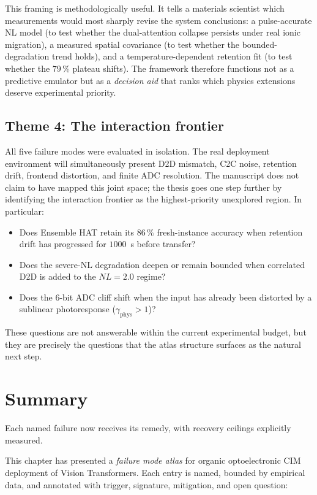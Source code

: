 This framing is methodologically useful.  It tells a materials scientist which measurements would most sharply revise the system conclusions: a pulse-accurate NL model (to test whether the dual-attention collapse persists under real ionic migration), a measured spatial covariance (to test whether the bounded-degradation trend holds), and a temperature-dependent retention fit (to test whether the $79\,\%$ plateau shifts).  The framework therefore functions not as a predictive emulator but as a \emph{decision aid} that ranks which physics extensions deserve experimental priority.

\subsection{Theme 4: The interaction frontier}

All five failure modes were evaluated in isolation.  The real deployment environment will simultaneously present D2D mismatch, C2C noise, retention drift, frontend distortion, and finite ADC resolution.  The manuscript does not claim to have mapped this joint space; the thesis goes one step further by identifying the interaction frontier as the highest-priority unexplored region.  In particular:
\begin{itemize}
    \item Does Ensemble HAT retain its $86\,\%$ fresh-instance accuracy when retention drift has progressed for $1000$~s before transfer?
    \item Does the severe-NL degradation deepen or remain bounded when correlated D2D is added to the $NL=2.0$ regime?
    \item Does the $6$-bit ADC cliff shift when the input has already been distorted by a sublinear photoresponse ($\gamma_{\mathrm{phys}} > 1$)?
\end{itemize}
These questions are not answerable within the current experimental budget, but they are precisely the questions that the atlas structure surfaces as the natural next step.


\section{Summary}

Each named failure now receives its remedy, with recovery ceilings explicitly measured.

This chapter has presented a \emph{failure mode atlas} for organic optoelectronic CIM deployment of Vision Transformers.  Each entry is named, bounded by empirical data, and annotated with trigger, signature, mitigation, and open question:

